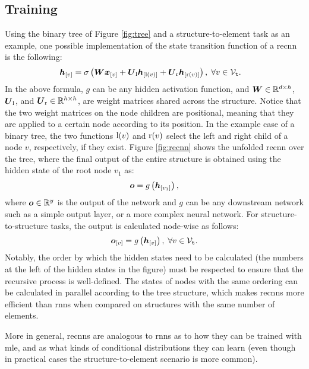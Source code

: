 \subsection{Training}
Using the binary tree of Figure \ref{fig:tree} and a structure-to-element task as an example, one possible implementation of the state transition function of a \gls{recnn} is the following:
\begin{align*}
    \Elem{h}{v} &= \sigma\Par{\Matrix{W}\Elem{x}{v} + \Matrix{U}_\Fun{l}\Elem{h}{\Fun{l}(v)} + \Matrix{U}_\Fun{r}\Elem{h}{\Fun{r}(v)}},\; \forall v \in \Nodes{t}.
\end{align*}
In the above formula, $g$ can be any hidden activation function, and $\Matrix{w} \in \Real^{d \times h}$, $\Matrix{u}_\Fun{l}$, and $\Matrix{u}_\Fun{r} \in \Real^{h \times h}$, are weight matrices shared across the structure. Notice that the two weight matrices on the node children are positional, meaning that they are applied to a certain node according to its position. In the example case of a binary tree, the two functions $\mathrm{l}(v)$ and $\mathrm{r}(v)$ select the left and right child of a node $v$, respectively, if they exist. Figure \ref{fig:recnn} shows the unfolded \gls{recnn} over the tree, where the final output of the entire structure is obtained using the hidden state of the root node $v_1$ as:
$$\Vector{o} = g\Par{\Elem{h}{v_1}},$$
where $\Vector{o} \in \Real^y$ is the output of the network and $g$ can be any downstream network such as a simple output layer, or a more complex neural network. For structure-to-structure tasks, the output is calculated node-wise as follows:
$$\Elem{o}{v} = g\Par{\Elem{h}{v}},\; \forall v \in \Nodes{t}.$$
Notably, the order by which the hidden states need to be calculated (the numbers at the left of the hidden states in the figure) must be respected to ensure that the recursive process is well-defined. The states of nodes with the same ordering can be calculated in parallel according to the tree structure, which makes \glspl{recnn} more efficient than \glspl{rnn} when compared on structures with the same number of elements.
\begin{figure*}[h!]
    \centering
    \resizebox{.5\textwidth}{!}{}
    \caption{A recursive neural network unfolded over the tree of Figure \ref{fig:tree} for a structure-to-element task. The number at the left of the hidden states indicates the order in which they are calculated. Notice the initialization of the hidden states at the leaves (indicated by dashed boxes).}
    \label{fig:recnn}
\end{figure*}
More in general, \glspl{recnn} are analogous to \glspl{rnn} as to how they can be trained with \gls{mle}, and as what kinds of conditional distributions they can learn (even though in practical cases the structure-to-element scenario is more common).

